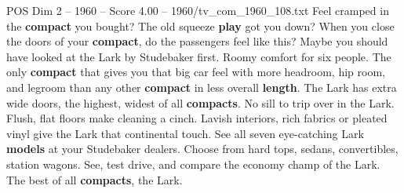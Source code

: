 \begin{textsample}{POS Dim 2 – 1960 – Score 4.00 – 1960/tv\_com\_1960\_108.txt}  \label{ex:f2_pos_023}
Feel cramped in the \textbf{compact} you bought?
The old squeeze \textbf{play} got you down?
When you close the doors of your \textbf{compact}, do the passengers feel like this?
Maybe you should have looked at the Lark by Studebaker first.
Roomy comfort for six people.
The only \textbf{compact} that gives you that big car feel with more headroom, hip room, and legroom than any other \textbf{compact} in less overall \textbf{length}.
The Lark has extra wide doors, the highest, widest of all \textbf{compacts}.
No sill to trip over in the Lark.
Flush, flat floors make cleaning a cinch.
Lavish interiors, rich fabrics or pleated vinyl give the Lark that continental touch.
See all seven eye-catching Lark \textbf{models} at your Studebaker dealers.
Choose from hard tops, sedans, convertibles, station wagons.
See, test drive, and compare the economy champ of the Lark.
The best of all \textbf{compacts}, the Lark.

\end{textsample}
